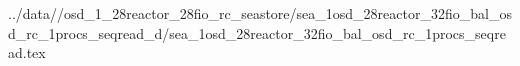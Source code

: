 ../data//osd_1_28reactor_28fio_rc_seastore/sea_1osd_28reactor_32fio_bal_osd_rc_1procs_seqread_d/sea_1osd_28reactor_32fio_bal_osd_rc_1procs_seqread.tex